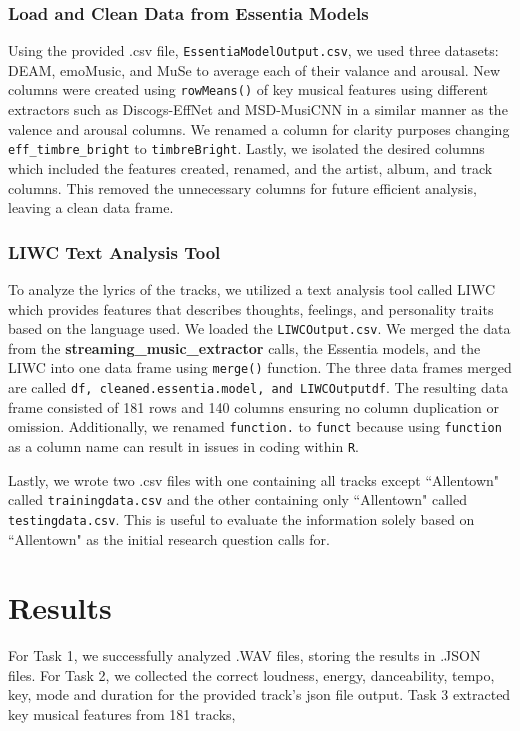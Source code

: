 \documentclass{article}\usepackage[]{graphicx}\usepackage[]{xcolor}
\begin{document}
\begin{multicols}{2}
\subsubsection{Load and Clean Data from Essentia Models}
Using the provided .csv file, \texttt{EssentiaModelOutput.csv}, we used three datasets: DEAM, emoMusic, and MuSe to average each of their valance and arousal. New columns were created using \texttt{rowMeans()} of key musical features using different extractors such as Discogs-EffNet and MSD-MusiCNN in a similar manner as the valence and arousal columns. We renamed a column for clarity purposes changing \texttt{eff\_timbre\_bright} to \texttt{timbreBright}. Lastly, we isolated the desired columns which included the features created, renamed, and the artist, album, and track columns. This removed the unnecessary columns for future efficient analysis, leaving a clean data frame. 

\subsubsection{LIWC Text Analysis Tool}
To analyze the lyrics of the tracks, we utilized a text analysis tool called LIWC which provides features that describes thoughts, feelings, and personality traits based on the language used. We loaded the \texttt{LIWCOutput.csv}. We merged the data from the 
\textbf{streaming\_music\_extractor} calls, the Essentia models, and the LIWC into one data frame using \texttt{merge()} function. The three data frames merged are called \texttt{df, cleaned.essentia.model, and LIWCOutputdf}. The resulting data frame consisted of 181 rows and 140 columns ensuring no column duplication or omission. Additionally, we renamed \texttt{function.} to \texttt{funct} because using \texttt{function} as a column name can result in issues in coding within \texttt{R}. 

Lastly, we wrote two .csv files with one containing all tracks except ``Allentown" called \texttt{trainingdata.csv} and the other containing only ``Allentown" called \texttt{testingdata.csv}. This is useful to evaluate the information solely based on ``Allentown" as the initial research question calls for. 

\section{Results}
For Task 1, we successfully analyzed .WAV files, storing the results in .JSON files. 
For Task 2, we collected the correct loudness, energy, danceability, tempo, key, mode and duration for the provided track's json file output. Task 3 extracted key musical features from 181 tracks,


\end{multicols}
\end{document}
